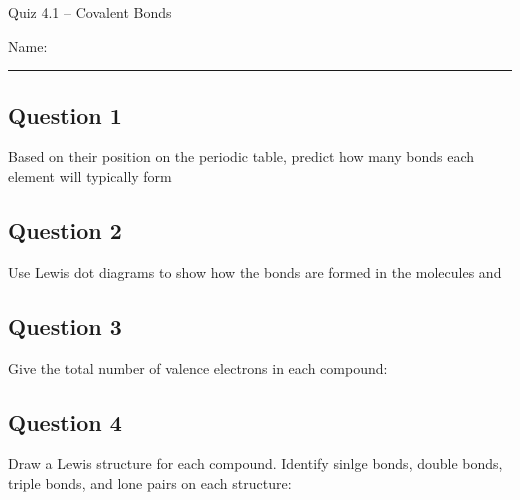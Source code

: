 \documentclass[11pt, letterpaper]{memoir}
\begin{document}
	\begin{center}
		{\large Quiz 4.1 --	Covalent Bonds}
	\end{center}
	{\large Name: \rule[-1mm]{4in}{.1pt} 


\subsection*{Question 1}
Based on their position on the periodic table, predict how many bonds each element will typically form

{\large {} \hspace{3em}  \hspace{3em}  \hspace{3em}  \hspace{3em}  \hspace{3em}  \hspace{3em}  \hspace{3em}  \hspace{3em} }

\vspace{1em}
\subsection*{Question 2}
Use Lewis dot diagrams to show how the bonds are formed in the molecules  and 

\vspace{3em}
\subsection*{Question 3}
Give the total number of valence electrons in each compound:

{\large {} \hspace{10em}  \hspace{10em} }

\vspace{2em}
\subsection*{Question 4}
Draw a Lewis structure for each compound. Identify sinlge bonds, double bonds, triple bonds, and lone pairs on each structure:

{\large {} \hspace{10em}  \hspace{10em} }

\vspace{7em}
}
\end{document}
